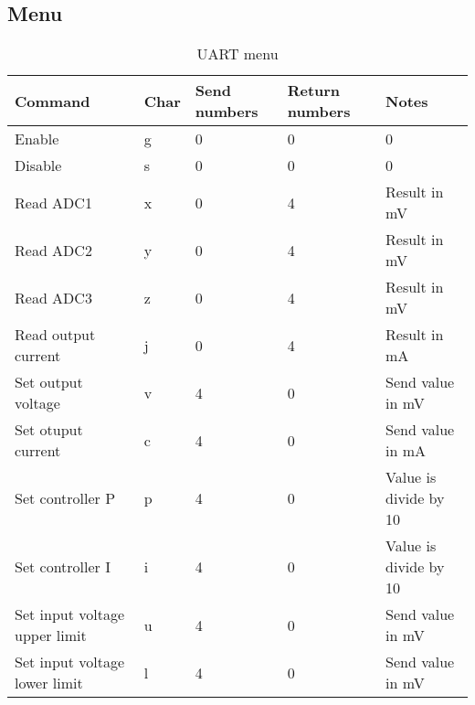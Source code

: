 \documentclass[12pt]{article}%
\begin{document}
\subsection{Menu}
\begin{table}[H]
   \centering
   \caption{UART menu}
   \label{tab:menu}
   \begin{tabular}{|p{4cm}|p{1.2cm}|p{1.8cm}|p{1.8cm}|p{4cm}|}
   \hline
      \textbf{Command}              & \textbf{Char}   &  \textbf{Send numbers}   &  \textbf{Return numbers}  &  \textbf{Notes}\\ \hline
      Enable                        & g               &  0                       &  0                        &  0                        \\ \hline
      Disable                       & s               &  0                       &  0                        &  0                        \\ \hline
      Read ADC1                     & x               &  0                       &  4                        &  Result in mV                         \\ \hline
      Read ADC2                     & y               &  0                       &  4                        &  Result in mV                         \\ \hline
      Read ADC3                     & z               &  0                       &  4                        &  Result in mV                         \\ \hline
      Read output current           & j               &  0                       &  4                        &  Result in mA              \\ \hline
      Set output voltage            & v               &  4                       &  0                        &  Send value in mV         \\ \hline
      Set otuput current            & c               &  4                       &  0                        &  Send value in mA    \\ \hline
      Set controller P              & p               &  4                       &  0                        &  Value is divide by 10    \\ \hline
      Set controller I              & i               &  4                       &  0                        &  Value is divide by 10         \\ \hline
      Set input voltage upper limit & u               &  4                       &  0                        &  Send value in mV             \\ \hline
      Set input voltage lower limit & l               &  4                       &  0                        &  Send value in mV         \\ \hline
   \end{tabular}
\end{table}

       
\end{document}
